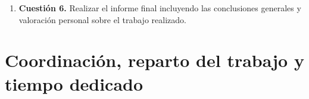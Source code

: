 \documentclass[12pt]{article}
\begin{document}
\begin{enumerate}
\medskip
\noindent\textbf{5.2 Instalación: constantes kcmp, A, B, C y D}\par
\smallskip


\medskip
\noindent\textbf{5.3 Número óptimo de procesos}\par
\smallskip



\newpage
\item \textbf{Cuestión 6.} Realizar el informe final incluyendo las conclusiones generales y valoración personal sobre el trabajo realizado.


\end{enumerate}

\newpage
\section{Coordinación, reparto del trabajo y tiempo dedicado}

\end{document}
